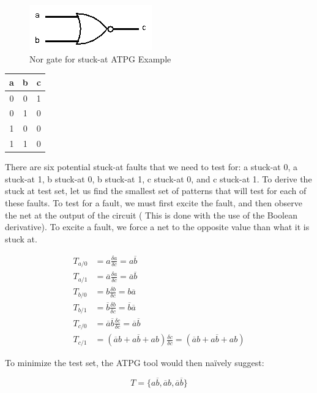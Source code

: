 \begin{figure}[h!]
\centering
\caption{Nor gate for stuck-at ATPG Example\label{fig:nor}}
\includegraphics[scale=0.5]{Figures/nor.png}
\end{figure}
\begin{center}
\begin{tabular}{ c c | c }
    a&b&c \\
    \hline
    0&0&1 \\
    0&1&0 \\
    1&0&0 \\
    1&1&0 \\
\end{tabular}
\end{center}

There are six potential stuck-at faults that we need to test for: a stuck-at 0, a stuck-at 1, b stuck-at 0, b stuck-at 1, c stuck-at 0, and c stuck-at 1. 
To derive the stuck at test set, let us find the smallest set of patterns that will test for each of these faults. 
To test for a fault, we must first excite the fault, and then observe the net at the output of the circuit ( This is done with the use of the Boolean derivative). 
To excite a fault, we force a net to the opposite value than what it is stuck at. 


\begin{align*}
    T_{a/0} &= a\frac{\delta a}{\delta c} = a\overline{b} \\
    T_{a/1} &= \overline{a}\frac{\delta a}{\delta c} = \overline{a}\overline{b} \\
    T_{b/0} &= b\frac{\delta b}{\delta c} = b\overline{a} \\ 
    T_{b/1} &= \overline{b}\frac{\delta b}{\delta c} = \overline{b}\overline{a} \\ 
    T_{c/0} &= \overline{a}\overline{b}\frac{\delta c}{\delta c} = \overline{a}\overline{b} \\ 
    T_{c/1} &= (\overline{a}b + a\overline{b} + ab)\frac{\delta c}{\delta c} = (\overline{a}b + a\overline{b} + ab) 
\end{align*}

To minimize the test set, the ATPG tool would then na\"ively suggest:

\begin{equation}
T=\{a\overline{b}, \overline{a}b, \overline{a}\overline{b}\}
\end{equation}

